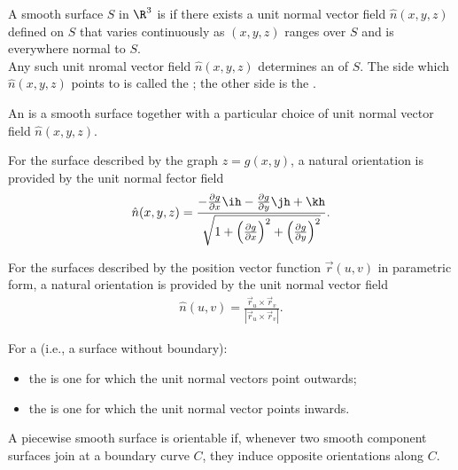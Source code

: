 \documentclass{article}
\begin{document}
\begin{definition}
    A smooth surface $S$ in $\R^3$ is  if there exists a unit normal vector
    field $\hat n(x,y,z)$ defined on $S$ that varies continuously as $(x,y,z)$ ranges over $S$
    and is everywhere normal to $S$.\\
    Any such unit nromal vector field $\hat n(x,y,z)$ determines an  of $S$.
    The side which $\hat n(x,y,z)$ points to is called the ; the other side is the
    .
\end{definition}
\begin{definition}
    An  is a smooth surface together with a particular choice of unit
    normal vector field $\hat n(x,y,z)$.
\end{definition}
\begin{lemma}
    For the surface described by the graph $z=g(x,y)$, a natural orientation is provided by
    the unit normal fector field
    \begin{align*}
        \hat n(x,y,z)=\frac{-\frac{\partial g}{\partial x}\ih -\frac{\partial g}{\partial y}\jh + \kh}{\sqrt{1+\left(\frac{\partial g}{\partial x}\right)^2 + \left(\frac{\partial g}{\partial y}\right)^2}}.
    \end{align*}
\end{lemma}
\begin{lemma}
    For the surfaces described by the position vector function $\vec r(u,v)$ in parametric form,
    a natural orientation is provided by the unit normal vector field
    \begin{align*}
        \hat n(u,v) = \frac{\vec r_u \times \vec r_v}{|\vec r_u \times \vec r_v|}.
    \end{align*}
\end{lemma}
\begin{definition}
    For a  (i.e., a surface without boundary):
    \begin{itemize}
        \item the  is one for which the unit normal vectors point outwards;
        \item the  is one for which the unit normal vector points inwards.
    \end{itemize}
\end{definition}
\begin{definition}
    A piecewise smooth surface is orientable if, whenever two smooth component surfaces join
    at a boundary curve $C$, they induce opposite orientations along $C$.
\end{definition}
\end{document}
